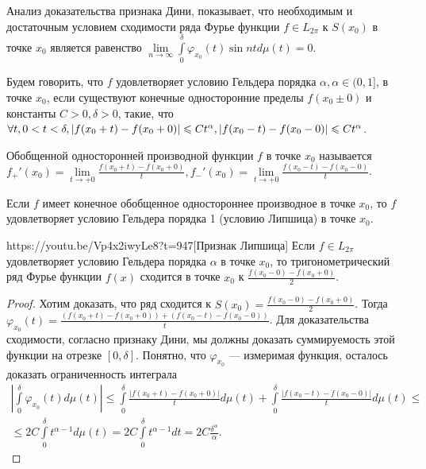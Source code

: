 \begin{note}
	Анализ доказательства признака Дини, показывает, что необходимым и достаточным условием сходимости ряда Фурье функции $f\in L_{2\pi}$ к $S(x_0)$ в точке $x_0$ является равенство $\lim\limits_{n\to\infty}\int\limits_{0}^\delta\varphi_{x_0}(t)\sin ntd\mu(t)=0$.
\end{note}

\begin{Def}
	Будем говорить, что $f$ удовлетворяет условию Гельдера порядка $\alpha, {\alpha\in (0,1]}$, в точке $x_0$, если существуют конечные односторонние пределы $f(x_0\pm 0)$ и константы $C>0, \delta>0$, такие, что $\forall t, 0<t<\delta, |f(x_0+t)-f(x_0+0)|\leqslant Ct^\alpha,\\ {|f(x_0-t)-f(x_0-0)|\leqslant Ct^\alpha}$.
\end{Def}

\begin{Def}
	Обобщенной односторонней производной функции $f$ в точке $x_0$ называется $f_+'(x_0)=\lim\limits_{t\to+0}\frac{f(x_0+t)-f(x_0+0)}{t}, f_-'(x_0)=\lim\limits_{t\to+0}\frac{f(x_0-t)-f(x_0-0)}{t}$.
\end{Def}

\begin{prop}
	Если $f$ имеет конечное обобщенное одностороннее производное в точке $x_0$, то $f$ удовлетворяет условию Гельдера порядка 1 (условию Липшица) в точке $x_0$.
\end{prop}

\begin{linkthm}{https://youtu.be/Vp4x2iwyLe8?t=947}[Признак Липшица]
	Если $f\in L_{2\pi}$ удовлетворяет условию Гельдера порядка $\alpha$ в точке $x_0$, то тригонометрический ряд Фурье функции $f(x)$ сходится в точке $x_0$ к $\frac{f(x_0-0)-f(x_0+0)}{2}$.
\end{linkthm}
\begin{proof}
	Хотим доказать, что ряд сходится к $S(x_0)=\frac{f(x_0-0)-f(x_0+0)}{2}$. Тогда $\varphi_{x_0}(t)=\frac{(f(x_0+t)-f(x_0+0))+(f(x_0-t)-f(x_0-0))}{t}$. Для доказательства сходимости, согласно признаку Дини, мы должны доказать суммируемость этой функции на отрезке $[0, \delta]$. Понятно, что $\varphi_{x_0}$ --- измеримая функция, осталось доказать ограниченность интеграла
	\begin{multline*}
		\left|\int\limits_{0}^\delta\varphi_{x_0}(t)d\mu(t)\right|\leqslant \int\limits_{0}^\delta\frac{|f(x_0+t)-f(x_0+0)|}{t}d\mu(t)+
		\int\limits_{0}^\delta\frac{|f(x_0-t)-f(x_0-0)|}{t}d\mu(t)\leqslant\\\leqslant 2C\int\limits_{0}^\delta t^{\alpha-1}d\mu(t)=2C\int\limits_{0}^\delta t^{\alpha-1}dt=2C\frac{\delta^\alpha}{\alpha}.
	\end{multline*}
\end{proof}

